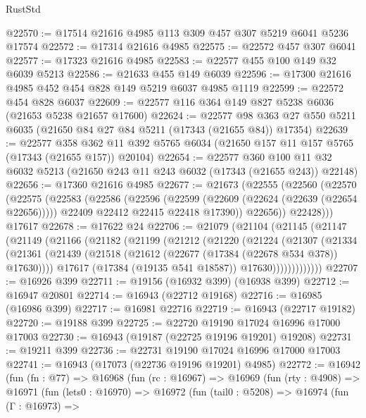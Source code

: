 \begin{lexlean}{RustStd}
\begin{coremodule}
@22570 := @17514 @21616 @4985 @113 @309 @457 @307 @5219 @6041 @5236 @17574
@22572 := @17314 @21616 @4985
@22575 := @22572 @457 @307 @6041
@22577 := @17323 @21616 @4985
@22583 := @22577 @455 @100 @149 @32 @6039 @5213
@22586 := @21633 @455 @149 @6039
@22596 := @17300 @21616 @4985 @452 @454 @828 @149 @5219 @6037 @4985 @1119
@22599 := @22572 @454 @828 @6037
@22609 := @22577 @116 @364 @149 @827 @5238 @6036 (@21653 @5238 @21657 @17600)
@22624 := @22577
    @98
    @363
    @27
    @550
    @5211
    @6035
    (@21650 @84 @27 @84 @5211 (@17343 (@21655 @84)) @17354)
@22639 := @22577
    @358
    @362
    @11
    @392
    @5765
    @6034
    (@21650 @157 @11 @157 @5765 (@17343 (@21655 @157)) @20104)
@22654 := @22577
    @360
    @100
    @11
    @32
    @6032
    @5213
    (@21650 @243 @11 @243 @6032 (@17343 (@21655 @243)) @22148)
@22656 := @17360 @21616 @4985
@22677 := @21673
    (@22555
      (@22560
        (@22570
          (@22575
            (@22583
              (@22586
                (@22596
                  (@22599 (@22609 (@22624 (@22639 (@22654 @22656)))))
                  @22409
                  @22412
                  @22415
                  @22418
                  @17390))
              @22656))
          @22428)))
    @17617
@22678 := @17622 @24
@22706 := @21079
    (@21104
      (@21145
        (@21147
          (@21149
            (@21166
              (@21182
                (@21199
                  (@21212
                    (@21220
                      (@21224
                        (@21307
                          (@21334
                            (@21361
                              (@21439 (@21518 (@21612 (@22677 (@17384 (@22678 @534 @378)) @17630))))
                              @17617
                              (@17384 (@19135 @541 @18587))
                              @17630)))))))))))))
@22707 := @16926 @399
@22711 := @19156 (@16932 @399) (@16938 @399)
@22712 := @16947 @20801
@22714 := @16943 (@22712 @19168)
@22716 := @16985 (@16986 @399)
@22717 := @16981 @22716
@22719 := @16943 (@22717 @19182)
@22720 := @19188 @399
@22725 := @22720 @19190 @17024 @16996 @17000 @17003
@22730 := @16943 (@19187 (@22725 @19196 @19201) @19208)
@22731 := @19211 @399
@22736 := @22731 @19190 @17024 @16996 @17000 @17003
@22741 := @16943 (@17073 (@22736 @19196 @19201) @4985)
@22772 := @16942
    (fun (fn : @77) =>
    @16968
      (fun (rc : @16967) =>
      @16969
        (fun (rty : @4908) =>
        @16971
          (fun (lets0 : @16970) =>
          @16972
            (fun (tail0 : @5208) =>
            @16974
              (fun (Γ : @16973) =>

\end{coremodule}
\end{lexlean}
